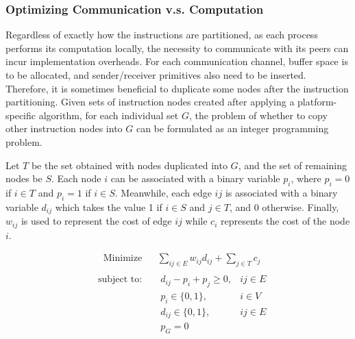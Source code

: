 \documentclass{sig-alternate}
\begin{document}

\subsubsection{Optimizing Communication v.s. Computation}
\label{opt}
 Regardless of exactly how the instructions are partitioned, as each process performs its computation locally, the necessity to communicate with its peers can incur implementation overheads.
For each communication channel, buffer space is to be allocated, and sender/receiver primitives also need to be inserted. Therefore, it is sometimes beneficial to duplicate some nodes after the instruction partitioning. Given sets of instruction nodes created after applying a platform-specific algorithm, for each individual set $G$, the problem of whether to copy other instruction nodes into $G$ can be formulated as an integer programming problem. 

Let $T$ be the set obtained with nodes duplicated into $G$, and the set of remaining nodes be $S$. Each node $i$ can be associated with a binary variable $p_i$, where $p_i = 0$ if $i \in T$ and $p_i = 1$ if $i \in S$. Meanwhile, each edge $ij$ is associated with
a binary variable $d_{ij}$ which takes the value 1 if $i \in S$ and $j \in T$, and 0 otherwise. Finally, $w_{ij}$ is used to represent the cost of edge $ij$
while $c_i$ represents the cost of the node $i$.


\begin{equation}
\begin{aligned}
\label{ilpopt}
& {\text{Minimize}} & & \underset{ij \in E}\sum w_{ij}d_{ij} +  \underset{j \in T}\sum c_j \\
\end{aligned}
\end{equation}
\begin{equation*}
\begin{aligned}
& \text{subject to: }
& &  d_{ij} - p_i+p_j \ge 0, & ij \in E \\
& &  & p_i \in \{0,1\}, & i \in V \\
& & & d_{ij} \in \{0,1\}, & ij \in E \\
& & & p_{G} = 0
\end{aligned}
\end{equation*}
\end{document}
